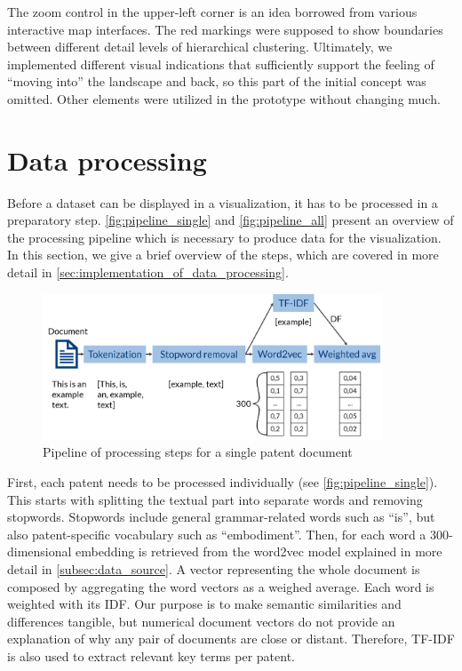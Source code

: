 The zoom control in the upper-left corner is an idea borrowed from various interactive map interfaces.
The red markings were supposed to show boundaries between different detail levels of hierarchical clustering.
Ultimately, we implemented different visual indications that sufficiently support the feeling of ``moving into'' the landscape and back, so this part of the initial concept was omitted.
Other elements were utilized in the prototype without changing much.

\section{Data processing}
\label{sec:pipeline}

Before a dataset can be displayed in a visualization, it has to be processed in a preparatory step.
\autoref{fig:pipeline_single} and \autoref{fig:pipeline_all} present an overview of the processing pipeline which is necessary to produce data for the visualization.
In this section, we give a brief overview of the steps, which are covered in more detail in \autoref{sec:implementation_of_data_processing}.

\begin{figure}[!]
\centering
\includegraphics[width=0.9\textwidth]{img/pipeline_single}
\caption{Pipeline of processing steps for a single patent document}
\label{fig:pipeline_single}
\end{figure}

First, each patent needs to be processed individually (see \autoref{fig:pipeline_single}).
This starts with splitting the textual part into separate words and removing stopwords.
Stopwords include general grammar-related words such as ``is'', but also patent-specific vocabulary such as ``embodiment''.
Then, for each word a 300-dimensional embedding is retrieved from the word2vec model explained in more detail in \autoref{subsec:data_source}.
A vector representing the whole document is composed by aggregating the word vectors as a weighed average.
Each word is weighted with its IDF.
Our purpose is to make semantic similarities and differences tangible, but numerical document vectors do not provide an explanation of why any pair of documents are close or distant. 
Therefore, TF-IDF is also used to extract relevant key terms per patent.


